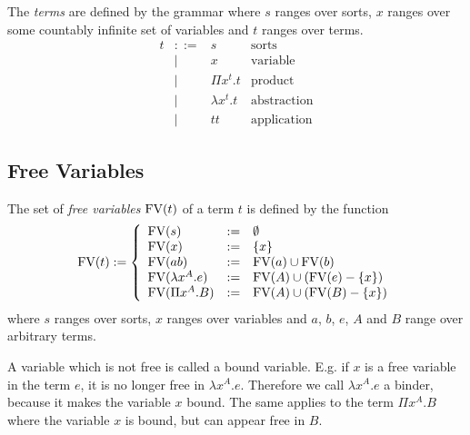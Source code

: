 \begin{definition}
    The \emph{terms} are defined by the grammar where $s$ ranges over sorts, $x$
    ranges over some countably infinite set of variables and $t$ ranges over
    terms.
    $$
    \begin{array}{llll}
        t

        &::=& s & \text{sorts}

        \\

        &\mid & x & \text{variable}

        \\

        &\mid & \Pi x^t. t & \text{product}

        \\

        &\mid & \lambda x^t. t & \text{abstraction}

        \\

        &\mid & t t & \text{application}
    \end{array}
    $$
\end{definition}








\subsection{Free Variables}

\begin{definition}
    The set of \emph{free variables} $\text{FV}(t)$ of a term $t$ is defined by the
    function
    $$
    \text{FV}(t) := \left\{ \begin{array}{llll} 
        \text{FV}(s) &:=& \emptyset
        \\
        \text{FV}(x) &:=& {\{x\}}
        \\
        \text{FV}(a b) &:=& \text{FV}(a) \cup \text{FV}(b)
        \\
        \text{FV}(\lambda x^A. e) &:=& \text{FV}(A) \cup (\text{FV}(e) - {\{x\}})
        \\
        \text{FV}(\Pi x^A. B) &:=& \text{FV}(A) \cup (\text{FV}(B) - {\{x\}})
     \end{array} \right.
    $$
    where $s$ ranges over sorts, $x$ ranges over variables and $a$, $b$,
    $e$, $A$ and $B$ range over arbitrary terms.
\end{definition}

A variable which is not free is called a bound variable. E.g. if $x$ is a free
variable in the term $e$, it is no longer free in $\lambda x^A. e$. Therefore we
call $\lambda x^A. e$ a binder, because it makes the variable $x$ bound. The
same applies to the term $\Pi x^A. B$  where the variable $x$ is bound, but can
appear free in $B$.

